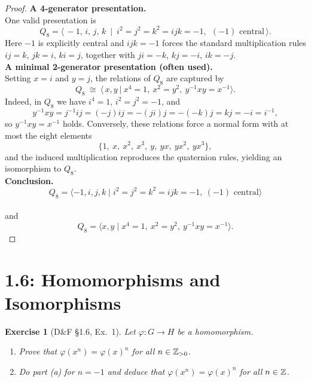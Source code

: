 \documentclass[12pt]{article}
\newtheorem{exercise}[theorem]{Exercise}
\theoremstyle{definition}
\begin{document}
\begin{proof}
\noindent\textbf{A 4-generator presentation.}\\
\noindent One valid presentation is
\[
Q_8=\langle\, -1,\, i,\, j,\, k\ \mid\ i^2=j^2=k^2=ijk=-1,\ \ (-1)\text{ central}\,\rangle.
\]
\noindent Here $-1$ is explicitly central and $ijk=-1$ forces the standard multiplication rules $ij=k$, $jk=i$, $ki=j$, together with $ji=-k$, $kj=-i$, $ik=-j$.\\

\noindent\textbf{A minimal 2-generator presentation (often used).}\\
\noindent Setting $x=i$ and $y=j$, the relations of $Q_8$ are captured by
\[
Q_8\ \cong\ \big\langle\, x,y\ \big|\ x^4=1,\ x^2=y^2,\ y^{-1}xy=x^{-1}\big\rangle.
\]
\noindent Indeed, in $Q_8$ we have $i^4=1$, $i^2=j^2=-1$, and
\[
y^{-1}xy=j^{-1}ij=(-j)ij=-(ji)j=-(-k)j=kj=-i=i^{-1},
\]
so $y^{-1}xy=x^{-1}$ holds. Conversely, these relations force a normal form with at most the eight elements
\[
\{1,\ x,\ x^2,\ x^3,\ y,\ yx,\ yx^2,\ yx^3\},
\]
and the induced multiplication reproduces the quaternion rules, yielding an isomorphism to $Q_8$.\\

\noindent\textbf{Conclusion.}\\
\[
\boxed{
Q_8=\langle -1,i,j,k\mid i^2=j^2=k^2=ijk=-1,\ (-1)\text{ central}\rangle
}
\]\\
and\\
\[
\boxed{
Q_8=\langle x,y\mid x^4=1,\ x^2=y^2,\ y^{-1}xy=x^{-1}\rangle.
}
\]
\end{proof}

\newpage

\dotfill
\section*{1.6: Homomorphisms and Isomorphisms}
\dotfill

\newpage

\begin{exercise}[D\&F §1.6, Ex.~1]
Let $\varphi:G\to H$ be a homomorphism.
\begin{enumerate}
\item[(a)] Prove that $\varphi(x^n)=\varphi(x)^n$ for all $n\in\Bbb Z_{>0}$.
\item[(b)] Do part (a) for $n=-1$ and deduce that $\varphi(x^n)=\varphi(x)^n$ for all $n\in\Bbb Z$.
\end{enumerate}
\end{exercise}
\end{document}
